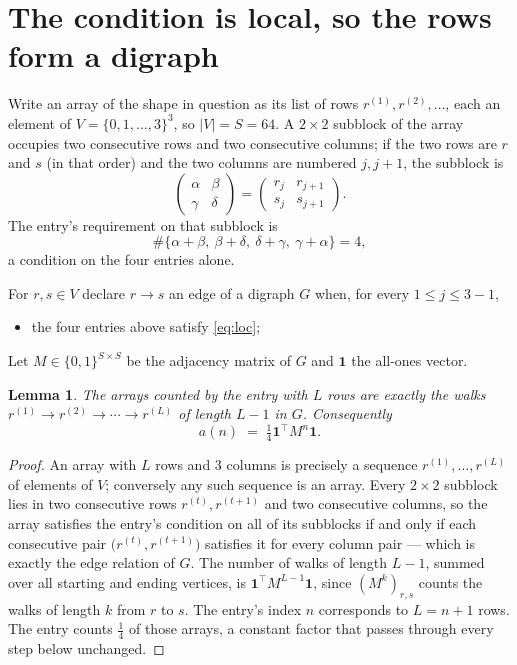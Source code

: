 \documentclass[11pt,a4paper]{article}
\theoremstyle{plain}
\newtheorem{lemma}[theorem]{Lemma}
\theoremstyle{definition}
\begin{document}
\section{The condition is local, so the rows form a digraph}

Write an array of the shape in question as its list of rows
$r^{(1)},r^{(2)},\dots$, each an element of
$V=\{0,1,\dots,3\}^{3}$, so $|V|=S=64$. A $2\times2$ subblock of the array
occupies two consecutive rows and two consecutive columns; if the two rows are $r$
and $s$ (in that order) and the two columns are numbered $j,j+1$,
the subblock is
\[
\begin{pmatrix}\alpha&\beta\\\gamma&\delta\end{pmatrix}=\begin{pmatrix}r_j&r_{j+1}\\s_j&s_{j+1}\end{pmatrix}.
\]
The entry's requirement on that subblock is
\begin{equation}\label{eq:loc}
\#\{\alpha+\beta,\ \beta+\delta,\ \delta+\gamma,\ \gamma+\alpha\}=4,
\end{equation}
a condition on the four entries alone.

For $r,s\in V$ declare $r\to s$ an edge of a digraph $G$ when, for every
$1\le j\le 3-1$,
\begin{itemize}
\item the four entries above satisfy \eqref{eq:loc};

\end{itemize}
Let $M\in\{0,1\}^{S\times S}$ be the adjacency matrix of $G$ and $\mathbf{1}$ the
all-ones vector.

\begin{lemma}\label{lem:walk}
The arrays counted by the entry with $L$ rows are exactly the walks
$r^{(1)}\to r^{(2)}\to\cdots\to r^{(L)}$ of length $L-1$ in $G$. Consequently
\[
a(n)\;=\;\tfrac1{4}\mathbf{1}^{\!\top}M^{n}\mathbf{1} .
\]
\end{lemma}

\begin{proof}
An array with $L$ rows and $3$ columns is precisely a sequence
$r^{(1)},\dots,r^{(L)}$ of elements of $V$; conversely any such sequence is an array.
Every $2\times2$ subblock lies in two consecutive rows $r^{(t)},r^{(t+1)}$ and two
consecutive columns, so the array satisfies the entry's condition on all of its subblocks
if and only if each consecutive pair $\bigl(r^{(t)},r^{(t+1)}\bigr)$ satisfies it for
every column pair --- which is exactly the edge relation of $G$. The number of walks of
length $L-1$, summed over all starting and ending vertices, is
$\mathbf{1}^{\!\top}M^{L-1}\mathbf{1}$, since $(M^{k})_{r,s}$ counts the walks of
length $k$ from $r$ to $s$. The entry's index $n$ corresponds to $L=n+1$ rows. The entry counts $\tfrac1{4}$ of those arrays, a constant factor that passes through every step below unchanged.
\end{proof}
\end{document}
